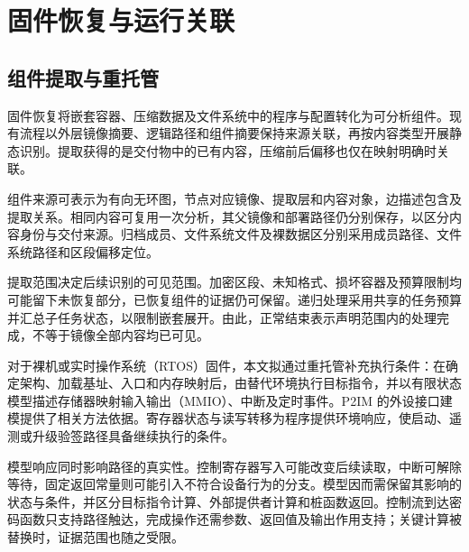 \section{固件恢复与运行关联}

\subsection{组件提取与重托管}
\label{subsec:firmware-rehosting-principles}

固件恢复将嵌套容器、压缩数据及文件系统中的程序与配置转化为可分析组件。现有流程以外层镜像摘要、逻辑路径和组件摘要保持来源关联，再按内容类型开展静态识别。提取获得的是交付物中的已有内容，压缩前后偏移也仅在映射明确时关联。

组件来源可表示为有向无环图，节点对应镜像、提取层和内容对象，边描述包含及提取关系。相同内容可复用一次分析，其父镜像和部署路径仍分别保存，以区分内容身份与交付来源。归档成员、文件系统文件及裸数据区分别采用成员路径、文件系统路径和区段偏移定位。

提取范围决定后续识别的可见范围。加密区段、未知格式、损坏容器及预算限制均可能留下未恢复部分，已恢复组件的证据仍可保留。递归处理采用共享的任务预算并汇总子任务状态，以限制嵌套展开。由此，正常结束表示声明范围内的处理完成，不等于镜像全部内容均已可见。

对于裸机或实时操作系统（RTOS）固件，本文拟通过重托管补充执行条件：在确定架构、加载基址、入口和内存映射后，由替代环境执行目标指令，并以有限状态模型描述存储器映射输入输出（MMIO）、中断及定时事件。P2IM 的外设接口建模提供了相关方法依据\cite{p2im2020}。寄存器状态与读写转移为程序提供环境响应，使启动、遥测或升级验签路径具备继续执行的条件。

模型响应同时影响路径的真实性。控制寄存器写入可能改变后续读取，中断可解除等待，固定返回常量则可能引入不符合设备行为的分支。模型因而需保留其影响的状态与条件，并区分目标指令计算、外部提供者计算和桩函数返回。控制流到达密码函数只支持路径触达，完成操作还需参数、返回值及输出作用支持；关键计算被替换时，证据范围也随之受限。


